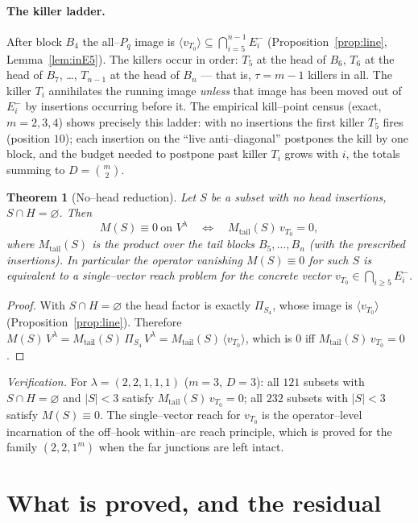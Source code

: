 \documentclass[11pt]{article}
\newtheorem{theorem}{Theorem}
\theoremstyle{definition}
\newcommand{\Pq}{P_{q}}
\newcommand{\la}{\lambda}
\newcommand{\Vl}{V^{\la}}
\newcommand{\Em}[1]{E^{-}_{#1}}
\begin{document}
\paragraph{The killer ladder.} After block $B_4$ the all--$\Pq$ image is
$\langle v_{T_0}\rangle\subseteq\bigcap_{i=5}^{n-1}\Em i$ (Proposition~\ref{prop:line},
Lemma~\ref{lem:inE5}). The killers occur in order: $T_5$ at the head of $B_6$, $T_6$ at the
head of $B_7$, \dots, $T_{n-1}$ at the head of $B_n$ --- that is, $\tau=m-1$ killers in
all. The killer $T_i$ annihilates the running image \emph{unless} that image has been moved
out of $\Em i$ by insertions occurring before it. The empirical kill--point census (exact,
$m=2,3,4$) shows precisely this ladder: with no insertions the first killer $T_5$ fires
(position $10$); each insertion on the ``live anti--diagonal'' postpones the kill by one
block, and the budget needed to postpone past killer $T_i$ grows with $i$, the totals
summing to $D=\binom m2$.

\begin{theorem}[No--head reduction]\label{thm:reduction}
Let $S$ be a subset with no head insertions, $S\cap H=\varnothing$. Then
\[
M(S)\equiv0\ \text{on }\Vl\quad\Longleftrightarrow\quad M_{\mathrm{tail}}(S)\,v_{T_0}=0,
\]
where $M_{\mathrm{tail}}(S)$ is the product over the tail blocks $B_5,\dots,B_n$ (with the
prescribed insertions). In particular the operator vanishing $M(S)\equiv0$ for such $S$ is
equivalent to a \emph{single--vector} reach problem for the concrete vector
$v_{T_0}\in\bigcap_{i\ge5}\Em i$.
\end{theorem}

\begin{proof}
With $S\cap H=\varnothing$ the head factor is exactly $\Pi_{S_4}$, whose image is
$\langle v_{T_0}\rangle$ (Proposition~\ref{prop:line}). Therefore
$M(S)\,\Vl=M_{\mathrm{tail}}(S)\,\Pi_{S_4}\,\Vl=M_{\mathrm{tail}}(S)\,\langle
v_{T_0}\rangle$, which is $0$ iff $M_{\mathrm{tail}}(S)\,v_{T_0}=0$.
\end{proof}

\noindent\emph{Verification.} For $\la=(2,2,1,1,1)$ ($m=3$, $D=3$): all $121$ subsets with
$S\cap H=\varnothing$ and $|S|<3$ satisfy $M_{\mathrm{tail}}(S)\,v_{T_0}=0$; all $232$
subsets with $|S|<3$ satisfy $M(S)\equiv0$. The single--vector reach for $v_{T_0}$ is the
operator--level incarnation of the off--hook within--arc reach principle, which is proved
for the family $(2,2,1^m)$ when the far junctions are left intact.

\section{What is proved, and the residual}
\end{document}
